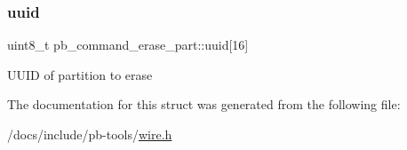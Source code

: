 \subsubsection{\texorpdfstring{uuid}{uuid}}
{\footnotesize\ttfamily uint8\+\_\+t pb\+\_\+command\+\_\+erase\+\_\+part\+::uuid\mbox{[}16\mbox{]}}

U\+U\+ID of partition to erase 

The documentation for this struct was generated from the following file\+:\begin{DoxyCompactItemize}
\item 
/docs/include/pb-\/tools/\hyperlink{wire_8h}{wire.\+h}\end{DoxyCompactItemize}
